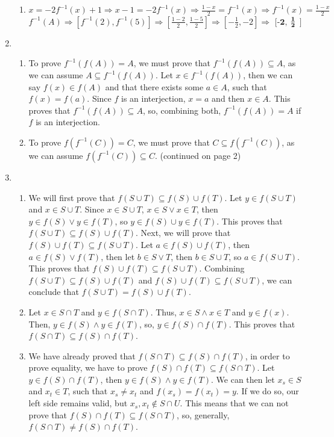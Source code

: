 \documentclass{article}
\begin{document}
\begin{enumerate}[label=\textbf{\arabic*}.]
\begin{enumerate}[label=\textbf{\alph*}.]
            \item $x=-2f^{-1}(x)+1 \Rightarrow x-1=-2f^{-1}(x) \Rightarrow \frac{1-x}{2}=f^{-1}(x) \Rightarrow f^{-1}(x)=\frac{1-x}{2}$ \vspace{0.1cm}
            $f^{-1}(A) \Rightarrow [f^{-1}(2),f^{-1}(5)] \Rightarrow [\frac{1-2}{2},\frac{1-5}{2}] \Rightarrow [-\frac{1}{2},-2] \Rightarrow$ $\textbf{[-2,}$ $\frac{\textbf1}{\textbf2}$ $\textbf{]}$
        \end{enumerate}
    \item
        \begin{enumerate}[label=\textbf{\alph*}.]
            \item To prove $f^{-1}(f(A))=A$, we must prove that $f^{-1}(f(A)) \subseteq A$, as we can assume $A \subseteq f^{-1}(f(A))$. Let $x \in f^{-1}(f(A))$, then we can say $f(x) \in f(A)$ and that there exists some $a \in A$, such that $f(x)=f(a)$. Since $f$ is an interjection, $x=a$ and then $x \in A$. This proves that $f^{-1}(f(A)) \subseteq A$, so, combining both, $f^{-1}(f(A))=A$ if $f$ is an interjection.
            \item To prove $f(f^{-1}(C))=C$, we must prove that $C \subseteq f(f^{-1}(C))$, as we can assume $f(f^{-1}(C)) \subseteq C$. (continued on page 2)
        \end{enumerate}
    \item 
        \begin{enumerate}[label=\textbf{\alph*}.]
            \item We will first prove that $f(S \cup T) \subseteq f(S) \cup f(T)$. Let $y \in f(S \cup T)$ and $x \in S \cup T$. Since $x \in S \cup T$, $x \in S \lor x \in T$, then $y \in f(S) \lor y \in f(T)$, so $y \in f(S) \cup y \in f(T)$. This proves that $f(S \cup T) \subseteq f(S) \cup f(T)$. Next, we will prove that $f(S) \cup f(T) \subseteq f(S \cup T)$. Let $a \in f(S) \cup f(T)$, then $a \in f(S) \lor f(T)$, then let $b \in S \lor T$, then $b \in S \cup T$, so $a \in f(S \cup T)$. This proves that $f(S) \cup f(T) \subseteq f(S \cup T)$. Combining $f(S \cup T) \subseteq f(S) \cup f(T)$ and $f(S) \cup f(T) \subseteq f(S \cup T)$, we can conclude that $f(S \cup T) = f(S) \cup f(T)$.
            \item Let $x \in S \cap T$ and $y \in f(S \cap T)$. Thus, $x \in S \land x \in T$ and $y \in f(x)$. Then, $y \in f(S) \land y \in f(T)$, so, $y \in f(S) \cap f(T)$. This proves that $f(S \cap T) \subseteq f(S) \cap f(T)$.
            \item We have already proved that $f(S \cap T) \subseteq f(S) \cap f(T)$, in order to prove equality, we have to prove $f(S) \cap f(T) \subseteq f(S \cap T)$. Let $ y \in f(S) \cap f(T)$, then $y \in f(S) \land y \in f(T)$. We can then let $x_s \in S$ and $x_t \in T$, such that $x_s \neq x_t$ and $f(x_s)=f(x_t)=y$. If we do so, our left side remains valid, but $x_s,x_t \notin S \cap U$. This means that we can not prove that $f(S) \cap f(T) \subseteq f(S \cap T)$, so, generally, $f(S \cap T) \neq f(S) \cap f(T)$.

\end{enumerate}
\end{enumerate}
\end{document}
